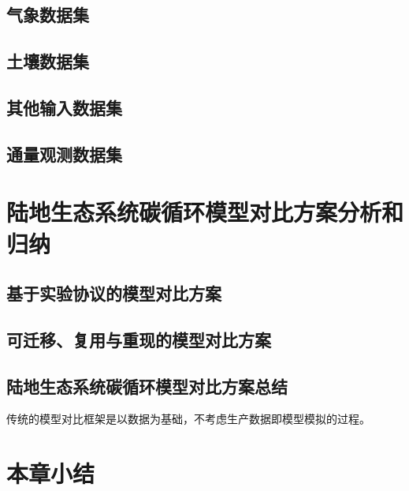 \subsection{气象数据集}
\subsection{土壤数据集}
\subsection{其他输入数据集}
\subsection{通量观测数据集}
\section{陆地生态系统碳循环模型对比方案分析和归纳}
\subsection{基于实验协议的模型对比方案}

\subsection{可迁移、复用与重现的模型对比方案}

\subsection{陆地生态系统碳循环模型对比方案总结}
传统的模型对比框架是以数据为基础，不考虑生产数据即模型模拟的过程。

\section{本章小结}